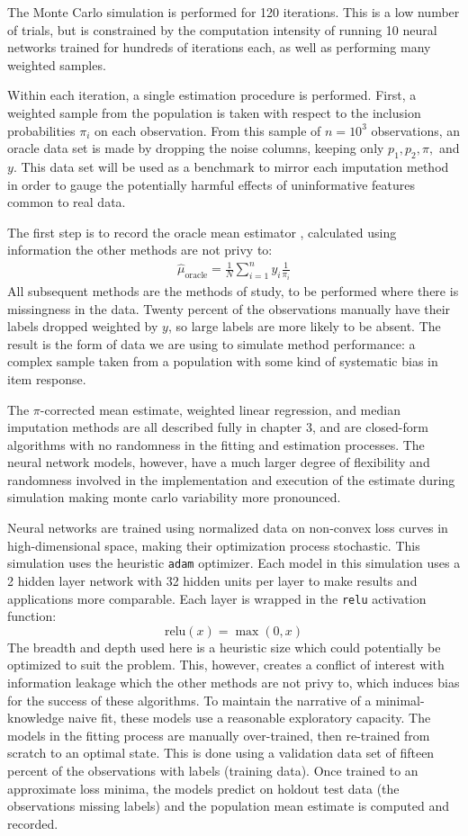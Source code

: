 \documentclass[12pt,twoside]{reedthesis}
\begin{document}
The Monte Carlo simulation is performed for 120 iterations. This is a
low number of trials, but is constrained by the computation intensity of
running 10 neural networks trained for hundreds of iterations each, as
well as performing many weighted samples.

Within each iteration, a single estimation procedure is performed.
First, a weighted sample from the population is taken with respect to
the inclusion probabilities \(\pi_i\) on each observation. From this
sample of \(n=10^3\) observations, an oracle data set is made by
dropping the noise columns, keeping only \(p_1, p_2, \pi,\) and \(y\).
This data set will be used as a benchmark to mirror each imputation
method in order to gauge the potentially harmful effects of
uninformative features common to real data.

The first step is to record the oracle mean estimator \label{eq:HTE},
calculated using information the other methods are not privy to:
\begin{align}
\hat \mu_{\text{oracle}} = \frac{1}{N} \sum_{i=1}^n y_i \frac{1}{\pi_i} \label{eq:HTE}
\end{align}
All subsequent methods are the methods of study, to be performed where
there is missingness in the data. Twenty percent of the observations
manually have their labels dropped weighted by \(y\), so large labels
are more likely to be absent. The result is the form of data we are
using to simulate method performance: a complex sample taken from a
population with some kind of systematic bias in item response.

The \(\pi\)-corrected mean estimate, weighted linear regression, and
median imputation methods are all described fully in chapter 3, and are
closed-form algorithms with no randomness in the fitting and estimation
processes. The neural network models, however, have a much larger degree
of flexibility and randomness involved in the implementation and
execution of the estimate during simulation making monte carlo
variability more pronounced.

Neural networks are trained using normalized data on non-convex loss
curves in high-dimensional space, making their optimization process
stochastic. This simulation uses the heuristic \texttt{adam} optimizer.
Each model in this simulation uses a 2 hidden layer network with 32
hidden units per layer to make results and applications more comparable.
Each layer is wrapped in the \texttt{relu} activation function: \[
\text{relu}(x) = \max(0,x)
\] The breadth and depth used here is a heuristic size which could
potentially be optimized to suit the problem. This, however, creates a
conflict of interest with information leakage which the other methods
are not privy to, which induces bias for the success of these
algorithms. To maintain the narrative of a minimal-knowledge naive fit,
these models use a reasonable exploratory capacity. The models in the
fitting process are manually over-trained, then re-trained from scratch
to an optimal state. This is done using a validation data set of fifteen
percent of the observations with labels (training data). Once trained to
an approximate loss minima, the models predict on holdout test data (the
observations missing labels) and the population mean estimate is
computed and recorded.
\end{document}

